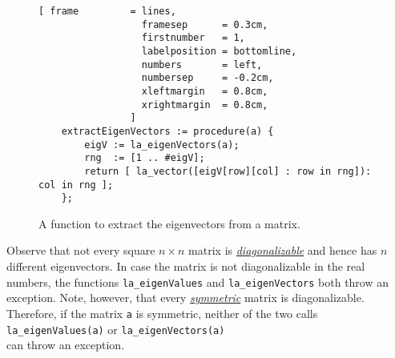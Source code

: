 \begin{figure}[!ht]
\centering
\begin{Verbatim}[ frame         = lines, 
                  framesep      = 0.3cm, 
                  firstnumber   = 1,
                  labelposition = bottomline,
                  numbers       = left,
                  numbersep     = -0.2cm,
                  xleftmargin   = 0.8cm,
                  xrightmargin  = 0.8cm,
                ]
    extractEigenVectors := procedure(a) {
        eigV := la_eigenVectors(a);
        rng  := [1 .. #eigV];
        return [ la_vector([eigV[row][col] : row in rng]): col in rng ];
    };
\end{Verbatim}
\vspace*{-0.3cm}
\caption{A function to extract the eigenvectors from a matrix.}
\label{fig:extract-eigenvectors.stlx}
\end{figure}

Observe that not every square $n \times n$ matrix is 
\href{http://en.wikipedia.org/wiki/Diagonalizable_matrix}{\emph{diagonalizable}}
and hence has $n$ different eigenvectors.  In case the matrix is not diagonalizable in the real
numbers, the functions \texttt{la\_eigenValues} and \texttt{la\_eigenVectors} both throw an
exception.  Note, however, that every 
\href{http://en.wikipedia.org/wiki/Symmetric_matrix}{\emph{symmetric}} matrix is diagonalizable.
Therefore, if the matrix \texttt{a} is symmetric, neither of the two calls
\\[0.2cm]
\hspace*{1.3cm}
\texttt{la\_eigenValues(a)} \quad or \quad \texttt{la\_eigenVectors(a)}
\\[0.2cm]
can throw an exception.






